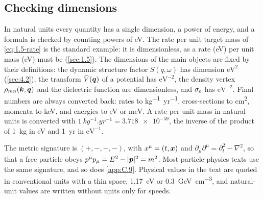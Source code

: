 \subsection{Checking dimensions}

In natural units every quantity has a single dimension, a power of energy, and a formula is checked by counting powers of eV. The rate per unit target mass of \cref{eq:1.5-rate} is the standard example: it is dimensionless, as a rate (eV) per unit mass (eV) must be (\cref{sec:1.5}). The dimensions of the main objects are fixed by their definitions: the dynamic structure factor $S(q,\omega)$ has dimension $\mathrm{eV}^2$ (\cref{sec:4.2}), the transform $\tilde V(\bm{q})$ of a potential has $\mathrm{eV}^{-2}$, the density vertex $\rho_{mn}(\bm{k},\bm{q})$ and the dielectric function are dimensionless, and $\bar{\sigma}_{e}$ has $\mathrm{eV}^{-2}$. Final numbers are always converted back: rates to \si{kg^{-1}.yr^{-1}}, cross-sections to \si{cm^2}, momenta to \si{keV}, and energies to \si{eV} or \si{meV}. A rate per unit mass in natural units is converted with $\SI{1}{kg^{-1}.yr^{-1}} = \num{3.718e-59}$, the inverse of the product of \SI{1}{kg} in eV and \SI{1}{yr} in $\mathrm{eV}^{-1}$.

The metric signature is $(+,-,-,-)$, with $x^\mu = (t, \bm{x})$ and $\partial_\mu\partial^\mu = \partial_t^2 - \nabla^2$, so that a free particle obeys $p^\mu p_\mu = E^2 - |\bm{p}|^2 = m^2$. Most particle-physics texts use the same signature, and so does \cref{app:C.9}. Physical values in the text are quoted in conventional units with a thin space, \SI{1.17}{eV} or \SI{0.3}{GeV.cm^{-3}}, and natural-unit values are written without units only for speeds.
